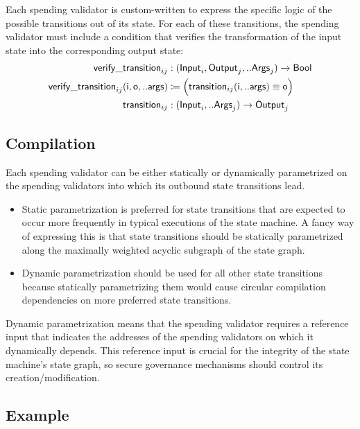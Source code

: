 \documentclass[../midgard.tex]{subfiles}
\begin{document}
Each spending validator is custom-written to express the specific logic of the possible transitions out of its state. For each of these transitions, the spending validator must include a condition that verifies the transformation of the input state into the corresponding output state:
\begin{align*}
    \mathsf{verify\_transition}_{ij} &: (\mathsf{Input}_i, \mathsf{Output}_j, ..\mathsf{Args}_j) -> \mathsf{Bool} \\
    \mathsf{verify\_transition}_{ij}\mathsf{(i, o, ..args)} &\coloneq
        \Bigl( \mathsf{transition}_{ij}\mathsf{(i, ..args) \equiv \mathsf{o}} \Bigr) \\
    \mathsf{transition}_{ij} &: (\mathsf{Input}_i, ..\mathsf{Args}_j) -> \mathsf{Output}_j
\end{align*}

\subsection{Compilation}
\label{h:single-threaded-state-machine-compilation}

Each spending validator can be either statically or dynamically parametrized on the spending validators into which its outbound state transitions lead.

\begin{itemize}
    \item Static parametrization is preferred for state transitions that are expected to occur more frequently in typical executions of the state machine. A fancy way of expressing this is that state transitions should be statically parametrized along the maximally weighted acyclic subgraph of the state graph.
    \item Dynamic parametrization should be used for all other state transitions because statically parametrizing them would cause circular compilation dependencies on more preferred state transitions.
\end{itemize}

Dynamic parametrization means that the spending validator requires a reference input that indicates the addresses of the spending validators on which it dynamically depends. This reference input is crucial for the integrity of the state machine's state graph, so secure governance mechanisms should control its creation/modification.

\subsection{Example}
\label{h:single-threaded-state-machine-example}
\end{document}
